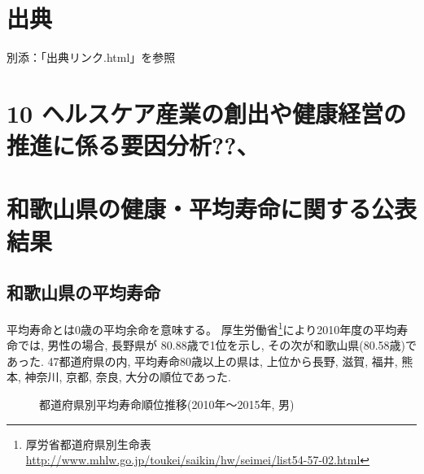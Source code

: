\chapter{出典}

別添：「出典リンク.html」を参照







\chapter{10 ヘルスケア産業の創出や健康経営の推進に係る要因分析??、
}




\chapter{
和歌山県の健康・平均寿命に関する公表結果}




\section{和歌山県の平均寿命}
平均寿命とは0歳の平均余命を意味する。
厚生労働省\footnote{
	厚労省都道府県別生命表
	\url{http://www.mhlw.go.jp/toukei/saikin/hw/seimei/list54-57-02.html}}により2010年度の平均寿命では,
男性の場合, 長野県が 80.88歳で1位を示し, その次が和歌山県(80.58歳)であった. 47都道府県の内, 平均寿命80歳以上の県は,
上位から長野, 滋賀,  福井, 熊本,  神奈川,   京都,   奈良,   大分の順位であった.

\begin{figure}[h!]
	\begin{center}
		\caption{都道府県別平均寿命順位推移(2010年〜2015年, 男)}
	\end{center}
\end{figure}



